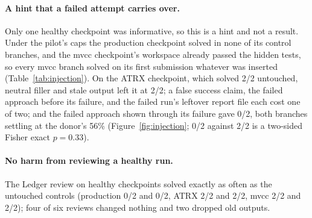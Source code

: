 \documentclass{article}
\begin{document}
\paragraph{A hint that a failed attempt carries over.}
Only one healthy checkpoint was informative, so this is a hint and not a result. Under the pilot's caps the production checkpoint solved in none of its
control branches, and the mvcc checkpoint's workspace already passed the hidden tests, so every mvcc branch solved on
its first submission whatever was inserted (Table~\ref{tab:injection}). On the ATRX checkpoint, which solved 2/2
untouched, neutral filler and stale output left it at 2/2; a false success claim, the failed approach before its
failure, and the failed run's leftover report file each cost one of two; and the failed approach shown through its
failure gave 0/2, both branches settling at the donor's 56\% (Figure~\ref{fig:injection}; 0/2 against 2/2 is a
two-sided Fisher exact $p = 0.33$).

\begin{table}[t]
\centering
\small
\caption{Injection test: solved out of branches per inserted content and healthy checkpoint (-- : no suitable
excerpt existed).}
\label{tab:injection}

\end{table}

\paragraph{No harm from reviewing a healthy run.} The Ledger review on healthy checkpoints solved exactly as often as
the untouched controls (production 0/2 and 0/2, ATRX 2/2 and 2/2, mvcc 2/2 and 2/2); four of six reviews changed
nothing and two dropped old outputs.
\end{document}

